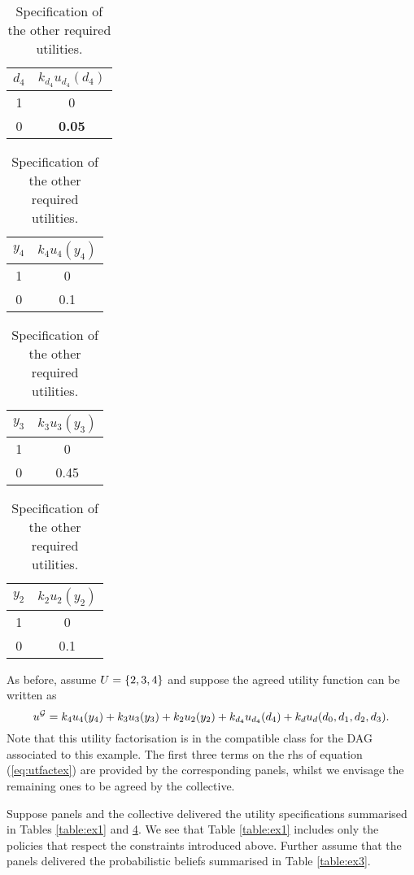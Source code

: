 \begin{table}
\begin{center}
\begin{tabular}{|c|c|}
\hline
$d_4$&$k_{d_4}u_{d_4}(d_4)$\\
\hline\hline
1&0\\
0&\textbf{0.05}\\
\hline
\end{tabular}
\hspace{0.5cm}
\begin{tabular}{|c|c|}
\hline
$y_4$&$k_4u_4(y_4)$\\
\hline\hline
1&0\\
0&0.1\\
\hline
\end{tabular}
\hspace{0.5cm}
\begin{tabular}{|c|c|}
\hline
$y_3$&$k_3u_3(y_3)$\\
\hline\hline
1&0\\
0&0.45\\
\hline
\end{tabular}
\hspace{0.5cm}
\begin{tabular}{|c|c|}
\hline
$y_2$&$k_2u_2(y_2)$\\
\hline\hline
1&0\\
0&0.1\\
\hline
\end{tabular}
\end{center}
\caption{Specification of the other required utilities. \label{table:ex2}}
\end{table}

As before, assume $U=\{2,3,4\}$ and suppose the agreed utility function can be written as
\begin{equation}
\label{eq:utfactex}
u^{\Gr}=k_4u_4(y_4)+k_3u_3(y_3)+k_2u_2(y_2)+k_{d_4}u_{d_4}(d_4)+k_{d}u_{d}(d_0,d_1,d_2,d_3).
\end{equation}
Note that this utility factorisation is in the compatible class for the DAG associated to this example. The first three terms on the rhs of equation (\ref{eq:utfactex}) are provided by the corresponding panels, whilst we envisage the remaining ones to be agreed by the collective.

Suppose panels and the collective delivered the utility specifications summarised in Tables \ref{table:ex1} and \ref{table:ex2}. We see that Table \ref{table:ex1} includes only the policies that respect the constraints introduced above. Further assume that the panels delivered the probabilistic beliefs summarised in Table \ref{table:ex3}.

